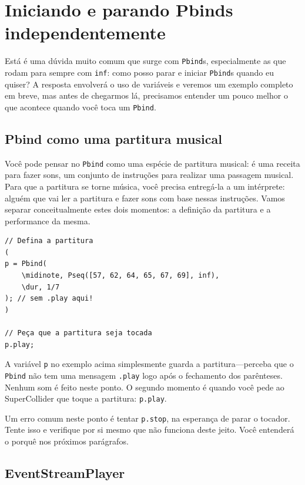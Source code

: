 \section{Iniciando e parando Pbinds independentemente}

Está é uma dúvida muito comum que surge com \texttt{Pbind}s, especialmente as que rodam para sempre com \texttt{inf}: como posso parar e iniciar \texttt{Pbind}s quando eu quiser? A resposta envolverá o uso de variáveis e veremos um exemplo completo em breve, mas antes de chegarmos lá, precisamos entender um pouco melhor o que acontece quando você toca um \texttt{Pbind}.

\subsection{Pbind como uma partitura musical}

Você pode pensar no \texttt{Pbind} como uma espécie de partitura musical: é uma receita para fazer sons, um conjunto de instruções para realizar uma passagem musical. Para que a partitura se torne música, você precisa entregá-la a um intérprete: alguém que vai ler a partitura e fazer sons com base nessas instruções. Vamos separar conceitualmente estes dois momentos: a definição da partitura e a performance da mesma.
 
\begin{lstlisting}[style=SuperCollider-IDE, basicstyle=\scttfamily\footnotesize]
// Defina a partitura
(
p = Pbind(
	\midinote, Pseq([57, 62, 64, 65, 67, 69], inf),
	\dur, 1/7
); // sem .play aqui!
)

// Peça que a partitura seja tocada
p.play;
\end{lstlisting}
 

A variável \texttt{p} no exemplo acima simplesmente guarda a partitura---perceba que o \texttt{Pbind} não tem uma mensagem \texttt{.play} logo após o fechamento dos parênteses. Nenhum som é feito neste ponto. O segundo momento é quando você pede ao SuperCollider que toque a partitura: \texttt{p.play}.

Um erro comum neste ponto é tentar \texttt{p.stop}, na esperança de parar o tocador. Tente isso e verifique por si mesmo que não funciona deste jeito. Você entenderá o porquê nos próximos parágrafos.

\subsection{EventStreamPlayer}

